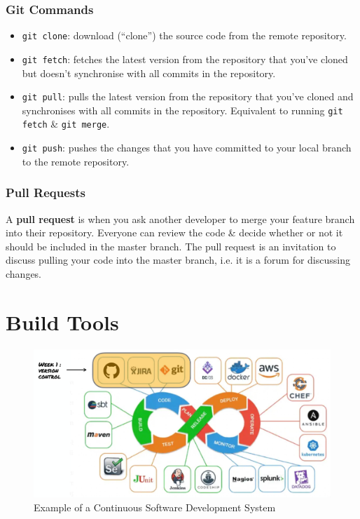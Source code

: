 \documentclass[a4paper,11pt]{article}
\begin{document}
\subsubsection{Git Commands}
\begin{itemize}
    \item   \texttt{git clone}: download (``clone'') the source code from the remote repository.
    \item   \texttt{git fetch}: fetches the latest version from the repository that you've cloned but doesn't synchronise with all commits
            in the repository.
    \item   \texttt{git pull}: pulls the latest version from the repository that you've cloned and synchronises with all commits
            in the repository. Equivalent to running \texttt{git fetch} \& \texttt{git merge}.
    \item   \texttt{git push}: pushes the changes that you have committed to your local branch to the remote repository.
\end{itemize}

\subsubsection{Pull Requests}
A \textbf{pull request} is when you ask another developer to merge your feature branch into their repository.
Everyone can review the code \& decide whether or not it should be included in the master branch.
The pull request is an invitation to discuss pulling your code into the master branch, i.e. it is a forum for discussing changes.

\section{Build Tools}
\begin{figure}[H]
    \centering
    \includegraphics[width=\textwidth]{images/example_cd.png}
    \caption{Example of a Continuous Software Development System}
\end{figure}
\end{document}
